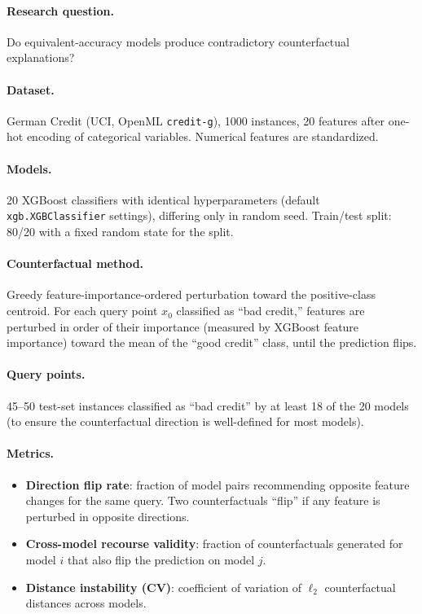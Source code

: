 \documentclass[11pt,a4paper]{article}
\begin{document}
\paragraph{Research question.}
Do equivalent-accuracy models produce contradictory counterfactual explanations?

\paragraph{Dataset.}
German Credit (UCI, OpenML \texttt{credit-g}), 1000 instances, 20 features
after one-hot encoding of categorical variables.  Numerical features are
standardized.

\paragraph{Models.}
20 XGBoost classifiers with identical hyperparameters (default \texttt{xgb.XGBClassifier}
settings), differing only in random seed.  Train/test split: 80/20 with a fixed
random state for the split.

\paragraph{Counterfactual method.}
Greedy feature-importance-ordered perturbation toward the positive-class centroid.
For each query point $x_0$ classified as ``bad credit,'' features are perturbed
in order of their importance (measured by XGBoost feature importance) toward the
mean of the ``good credit'' class, until the prediction flips.

\paragraph{Query points.}
45--50 test-set instances classified as ``bad credit'' by at least 18 of the
20 models (to ensure the counterfactual direction is well-defined for most
models).

\paragraph{Metrics.}
\begin{itemize}[nosep]
  \item \textbf{Direction flip rate}: fraction of model pairs recommending
    opposite feature changes for the same query.  Two counterfactuals ``flip''
    if any feature is perturbed in opposite directions.
  \item \textbf{Cross-model recourse validity}: fraction of counterfactuals
    generated for model $i$ that also flip the prediction on model $j$.
  \item \textbf{Distance instability (CV)}: coefficient of variation of
    $\ell_2$ counterfactual distances across models.
\end{itemize}
\end{document}
